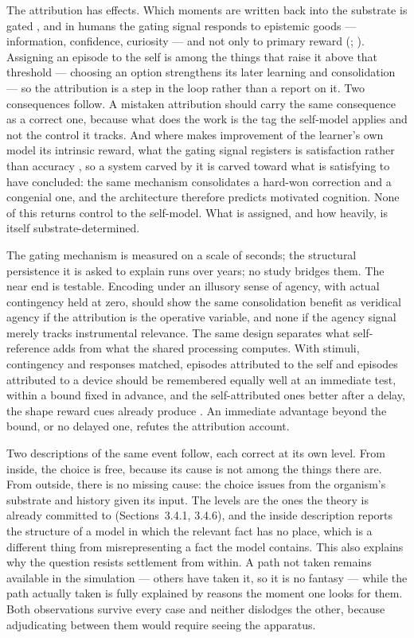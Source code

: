 \documentclass[12pt]{article}
\begin{document}
The attribution has effects. Which moments are written back into the substrate is gated \citep{PawlakKerr2008,Hong2022}, and in humans the gating signal responds to epistemic goods --- information, confidence, curiosity --- and not only to primary reward (\citealp*{GruberGelmanRanganath2014}; \citealp{Guggenmos2016}). Assigning an episode to the self is among the things that raise it above that threshold --- choosing an option strengthens its later learning and consolidation \citep{Cockburn2014,Murty2019,Luettgau2020} --- so the attribution is a step in the loop rather than a report on it. Two consequences follow. A mistaken attribution should carry the same consequence as a correct one, because what does the work is the tag the self-model applies and not the control it tracks. And where \citet{Schmidhuber2010} makes improvement of the learner's own model its intrinsic reward, what the gating signal registers is satisfaction rather than accuracy \citep{Charpentier2018}, so a system carved by it is carved toward what is satisfying to have concluded: the same mechanism consolidates a hard-won correction and a congenial one, and the architecture therefore predicts motivated cognition. None of this returns control to the self-model. What is assigned, and how heavily, is itself substrate-determined.

The gating mechanism is measured on a scale of seconds; the structural persistence it is asked to explain runs over years; no study bridges them. The near end is testable. Encoding under an illusory sense of agency, with actual contingency held at zero, should show the same consolidation benefit as veridical agency if the attribution is the operative variable, and none if the agency signal merely tracks instrumental relevance. The same design separates what self-reference adds from what the shared processing computes. With stimuli, contingency and responses matched, episodes attributed to the self and episodes attributed to a device should be remembered equally well at an immediate test, within a bound fixed in advance, and the self-attributed ones better after a delay, the shape reward cues already produce \citep{MurayamaKitagami2014}. An immediate advantage beyond the bound, or no delayed one, refutes the attribution account.

Two descriptions of the same event follow, each correct at its own level. From inside, the choice is free, because its cause is not among the things there are. From outside, there is no missing cause: the choice issues from the organism's substrate and history given its input. The levels are the ones the theory is already committed to (Sections~3.4.1, 3.4.6), and the inside description reports the structure of a model in which the relevant fact has no place, which is a different thing from misrepresenting a fact the model contains. This also explains why the question resists settlement from within. A path not taken remains available in the simulation --- others have taken it, so it is no fantasy --- while the path actually taken is fully explained by reasons the moment one looks for them. Both observations survive every case and neither dislodges the other, because adjudicating between them would require seeing the apparatus.
\end{document}
